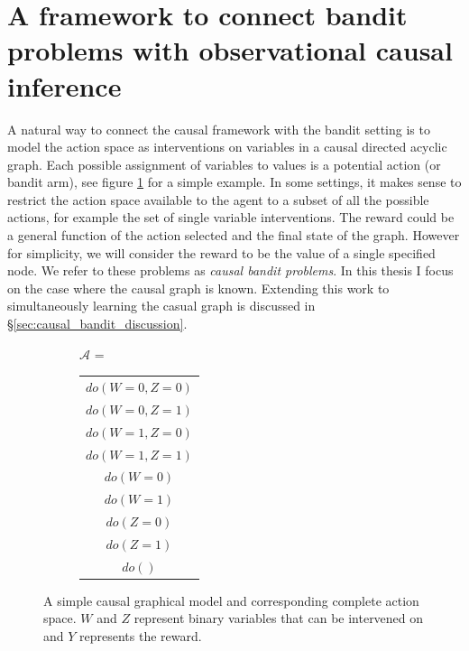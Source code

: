 \documentclass[11pt,a4paper,oneside]{book}
\newcommand{\actionspace}{\mathcal{A}}
\theoremstyle{plain}
\theoremstyle{definition}
\begin{document}
\section{A framework to connect bandit problems with observational causal inference}
\label{sec:intro_causal_bandit}
A natural way to connect the causal framework with the bandit setting is to model the action space as interventions on variables in a causal directed acyclic graph. Each possible assignment of variables to values is a potential action (or bandit arm), see figure \ref{fig:unify_frameworks} for a simple example. In some settings, it makes sense to restrict the action space available to the agent to a subset of all the possible actions, for example the set of single variable interventions. The reward could be a general function of the action selected and the final state of the graph. However for simplicity, we will consider the reward to be the value of a single specified node. We refer to these problems as \emph{causal bandit problems}. In this thesis I focus on the case where the causal graph is known. Extending this work to simultaneously learning the casual graph is discussed in \S\ref{sec:causal_bandit_discussion}.

\begin{figure}
\centering
\begin{subfigure}[c]{0.3\textwidth}
\end{subfigure}
\begin{subfigure}[t]{0.4\textwidth}
$\actionspace$ = \begin{tabular}{|c|}
	\hline
  $do(W=0,Z=0)$ \\
  $do(W=0,Z=1)$ \\
  $do(W=1,Z=0)$ \\
  $do(W=1,Z=1)$ \\
  \hline
  $do(W=0)$ \\
  $do(W=1)$ \\
  $do(Z=0)$ \\
  $do(Z=1)$ \\
  $do()$ \\
  \hline
\end{tabular}
\end{subfigure}
\caption{A simple causal graphical model and corresponding complete action space. $W$ and $Z$ represent binary variables that can be intervened on and $Y$ represents the reward.}
\label{fig:unify_frameworks}
\end{figure} 
\end{document}
